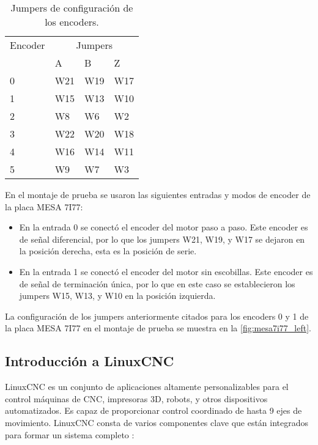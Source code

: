 \documentclass[english,spanish,a4paper,11pt]{article}
\begin{document}
\begin{table}[!ht]
    \centering
    \begin{tabular}{llll}
        \toprule
        Encoder & \multicolumn{3}{c}{Jumpers} \\
        \cmidrule{2-4}
        & A & B & Z \\
        \midrule
        0 & W21 & W19 & W17 \\
        1 & W15 & W13 & W10 \\
        2 & W8  & W6  & W2 \\
        3 & W22 & W20 & W18 \\
        4 & W16 & W14 & W11 \\
        5 & W9  & W7  & W3 \\
        \bottomrule
    \end{tabular}
    \caption{Jumpers de configuración de los encoders.}
    \label{tab:encoder_jumpers}
\end{table}

En el montaje de prueba se usaron las siguientes entradas y modos de encoder de la placa MESA 7I77:
\begin{itemize}
    \item En la entrada 0 se conectó el encoder del motor paso a paso. Este encoder es de señal diferencial, por lo que los jumpers W21, W19, y W17 se dejaron en la posición derecha, esta es la posición de serie.

    \item En la entrada 1 se conectó el encoder del motor sin escobillas. Este encoder es de señal de terminación única, por lo que en este caso se establecieron los jumpers W15, W13, y W10 en la posición izquierda. 
\end{itemize}

La configuración de los jumpers anteriormente citados para los encoders 0 y 1 de la placa MESA 7I77 en el montaje de prueba se muestra en la \cref{fig:mesa7i77_left}.


\subsection{Introducción a LinuxCNC}

LinuxCNC es un conjunto de aplicaciones altamente personalizables para el control máquinas de \ac{CNC}, impresoras 3D, robots, y otros dispositivos automatizados. Es capaz de proporcionar control coordinado de hasta 9 ejes de movimiento. LinuxCNC consta de varios componentes clave que están integrados para formar un sistema completo \cite{linuxcncdoc}:
\end{document}
